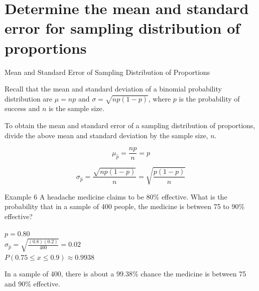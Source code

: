 \documentclass[t]{beamer}
\begin{document}
\section{Determine the mean and standard error for sampling distribution of proportions}

\begin{frame}{Mean and Standard Error of Sampling Distribution of Proportions}

Recall that the mean and standard deviation of a binomial probability distribution are $\mu = np$ and $\sigma = \sqrt{np(1-p)}$, where $p$ is the probability of success and $n$ is the sample size. \newline\\	\pause

To obtain the mean and standard error of a sampling distribution of proportions, divide the above mean and standard deviation by the sample size, $n$.		\pause

\[\mu_{\hat{p}} = \frac{np}{n} = p\]	\pause

\[\sigma_{\hat{p}} = \frac{\sqrt{np(1-p)}}{n} = \sqrt{\frac{p(1-p)}{n}}\]

\end{frame}


\begin{frame}{Example 6}
A headache medicine claims to be 80\% effective. What is the probability that in a sample of 400 people, the medicine is between 75 to 90\% effective?	\newline\\	\pause

$p = 0.80$	\newline\\	\pause
$\sigma_{\hat{p}} = \sqrt{\frac{(0.8)(0.2)}{400}} = 0.02$	\newline\\	\pause
$P(0.75 \leq x \leq 0.9) \approx 0.9938$	\newline\\	\pause

In a sample of 400, there is about a 99.38\% chance the medicine is between 75 and 90\% effective.
\end{frame}
\end{document}
